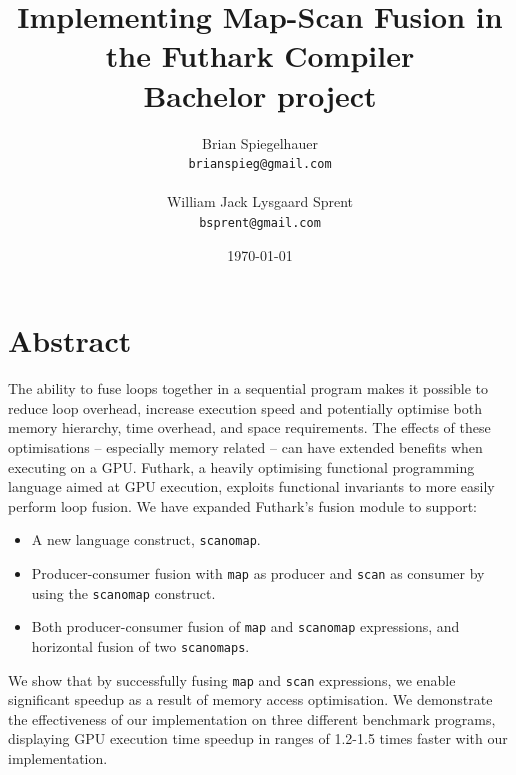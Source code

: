 \documentclass[11pt,bibliography=totocnumbered]{article}
\title{
  \vspace{3cm}
  \Huge{Implementing Map-Scan Fusion in the Futhark Compiler} \\
  \Large{Bachelor project}
}
\author{
  \Large{Brian Spiegelhauer}
  \\ \texttt{brianspieg@gmail.com} \\ \\
   \Large{William Jack Lysgaard Sprent}
  \\ \texttt{bsprent@gmail.com} \\
}
\date{
    \today
}
\def \ColourPDF {include/nat-farve}
\def \TitlePDF   {include/nat-en}  %
\begin{document}
\lstset{language=C, frame=single, numbers=left, breaklines=true}



\clearpage\maketitle
\thispagestyle{empty}

\newpage

\tableofcontents

\newpage

\section{Abstract}
The ability to fuse loops together in a sequential program makes it possible to reduce loop overhead, increase execution speed and potentially optimise both memory hierarchy, time overhead, and space requirements. The effects of these optimisations -- especially memory related -- can have extended benefits when executing on a GPU. Futhark, a heavily optimising functional
 programming language aimed at GPU execution,
 exploits functional invariants to more easily perform loop fusion. We have expanded Futhark's fusion module to support:

\begin{itemize}
\item A new language construct, \texttt{scanomap}.
\item Producer-consumer fusion with \texttt{map} as producer and \texttt{scan} as consumer by using the \texttt{scanomap} construct.
\item Both producer-consumer fusion of \texttt{map} and \texttt{scanomap} expressions, and horizontal fusion of two \texttt{scanomaps}.
\end{itemize}
We show that by successfully fusing \texttt{map} and \texttt{scan} expressions, we enable significant speedup as a result of memory access optimisation. 
We demonstrate the effectiveness of our implementation on three different benchmark programs, displaying GPU execution time speedup in ranges of 1.2-1.5 times faster with our implementation.
\end{document}
